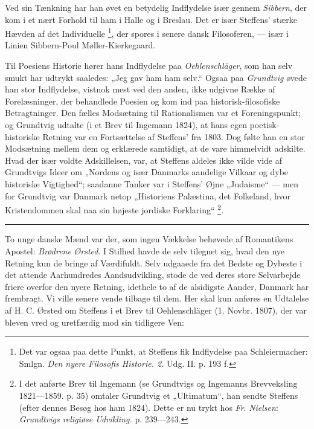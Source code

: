 \documentclass[12pt,a4paper,openany]{book}
\newcommand{\opage}[1]{\marginnote{\footnotesize\textit{[#1]}}}
\begin{document}
\setcounter{footnote}{0}%
\opage{47}Ved sin Tænkning har han øvet en betydelig Indflydelse især gennem
\emph{Sibbern}, der kom i et nært Forhold til ham i Halle og i Breslau. Det er
især Steffens' stærke Hævden af det Individuelle%
\footnote[1]{Det var ogsaa paa dette Punkt, at Steffens fik Indflydelse paa
Schleiermacher: Smlgn. \textit{Den nyere Filosofis Historie. 2.} Udg. II. p.
193 f.}, der spores i senere dansk Filosoferen, --- især i Linien Sibbern-Poul
Møller-Kierkegaard.

Til Poesiens Historie hører hans Indflydelse paa \emph{Oehlenschläger}, som han
selv smukt har udtrykt saaledes: „Jeg gav ham ham selv.“ Ogsaa paa
\emph{Grundtvig} øvede han stor Indflydelse, vistnok mest ved den anden, ikke
udgivne Række af Forelæsninger, der behandlede Poesien og kom ind paa
historisk-filosofiske Betragtninger. Den fælles Modsætning til Rationalismen
var et Foreningspunkt; og Grundtvig udtalte (i et Brev til Ingemann 1824), at
hans egen poetisk-historiske Retning var en Fortsættelse af Steffens' fra 1803.
Dog følte han en stor Modsætning mellem dem og erklærede samtidigt, at de vare
himmelvidt adskilte. Hvad der især voldte Adskillelsen, var, at Steffens
aldeles ikke vilde vide af Grundtvigs Ideer om „Nordens og især Danmarks
aandelige Vilkaar og dybe historiske Vigtighed“; saadanne Tanker var i
Steffens' Øjne „Judaisme“ --- men for Grundtvig var Danmark netop „Historiens
Palæstina, det Folkeland, hvor Kristendommen skal naa sin højeste jordiske
Forklaring“%
\footnote[2]{I det anførte Brev til Ingemann (se Grundtvigs og Ingemanns
Brevveksling 1821---1859. p. 35) omtaler Grundtvig et „Ultimatum“, han sendte
Steffens (efter dennes Besøg hos ham 1824). Dette er nu trykt hos \emph{Fr}.
\emph{Nielsen}: \textit{Grundtvigs religiøse Udvikling.} p. 239---243.}.

\begin{center}\rule{2cm}{0.4pt}\end{center}

To unge danske Mænd var der, som ingen Vækkelse behøvede af Romantikens
Apostel: \emph{Brødrene} \emph{Ørsted}. I Stilhed havde de selv tilegnet sig,
hvad den nye Retning kun%
\setcounter{footnote}{0}%
\opage{48}de bringe af Værdifuldt. Selv udgaaede fra det Bedste og Dybeste i
det attende Aarhundredes Aandsudvikling, stode de ved deres store Selvarbejde
friere overfor den nyere Retning, idethele to af de alsidigste Aander, Danmark
har frembragt. Vi ville senere vende tilbage til dem. Her skal kun anføres en
Udtalelse af H. C. Ørsted om Steffens i et Brev til Oehlenschläger (1. Novbr.
1807), der var bleven vred og uretfærdig mod sin tidligere Ven:
\end{document}
